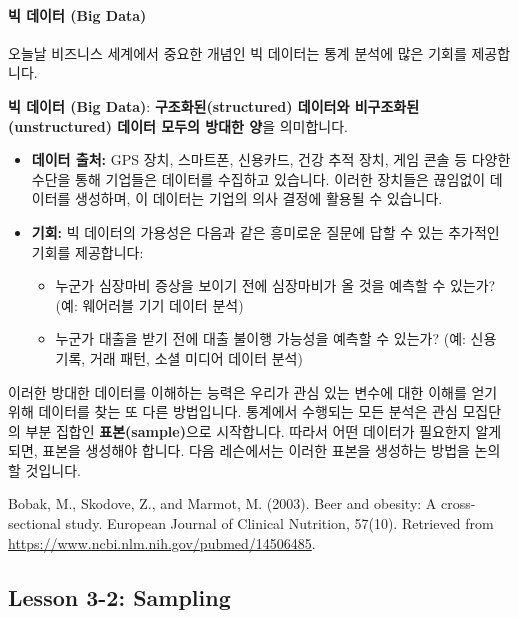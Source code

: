 \documentclass[11pt,a4paper]{book}
\newcommand{\concept}[1]{\textbf{#1}}
\theoremstyle{definition}
\begin{document}
\paragraph{빅 데이터 (Big Data)}
오늘날 비즈니스 세계에서 중요한 개념인 빅 데이터는 통계 분석에 많은 기회를 제공합니다.

\begin{tcolorbox}[infobox, title={빅 데이터 (Big Data)}]
\concept{빅 데이터 (Big Data)}: \textbf{구조화된(structured) 데이터와 비구조화된(unstructured) 데이터 모두의 방대한 양}을 의미합니다.
\end{tcolorbox}

\begin{itemize}
    \item \textbf{데이터 출처:} GPS 장치, 스마트폰, 신용카드, 건강 추적 장치, 게임 콘솔 등 다양한 수단을 통해 기업들은 데이터를 수집하고 있습니다. 이러한 장치들은 끊임없이 데이터를 생성하며, 이 데이터는 기업의 의사 결정에 활용될 수 있습니다.
    \item \textbf{기회:} 빅 데이터의 가용성은 다음과 같은 흥미로운 질문에 답할 수 있는 추가적인 기회를 제공합니다:
    \begin{itemize}
        \item 누군가 심장마비 증상을 보이기 전에 심장마비가 올 것을 예측할 수 있는가? (예: 웨어러블 기기 데이터 분석)
        \item 누군가 대출을 받기 전에 대출 불이행 가능성을 예측할 수 있는가? (예: 신용 기록, 거래 패턴, 소셜 미디어 데이터 분석)
    \end{itemize}
\end{itemize}
이러한 방대한 데이터를 이해하는 능력은 우리가 관심 있는 변수에 대한 이해를 얻기 위해 데이터를 찾는 또 다른 방법입니다. 통계에서 수행되는 모든 분석은 관심 모집단의 부분 집합인 \concept{표본(sample)}으로 시작합니다. 따라서 어떤 데이터가 필요한지 알게 되면, 표본을 생성해야 합니다. 다음 레슨에서는 이러한 표본을 생성하는 방법을 논의할 것입니다.

\begin{tcolorbox}[infobox, title={학술 인용 (Academic Citation)}]
Bobak, M., Skodove, Z., and Marmot, M. (2003). Beer and obesity: A cross-sectional study. European Journal of Clinical Nutrition, 57(10). Retrieved from \url{https://www.ncbi.nlm.nih.gov/pubmed/14506485}.
\end{tcolorbox}


\subsection{Lesson 3-2: Sampling}
\end{document}
